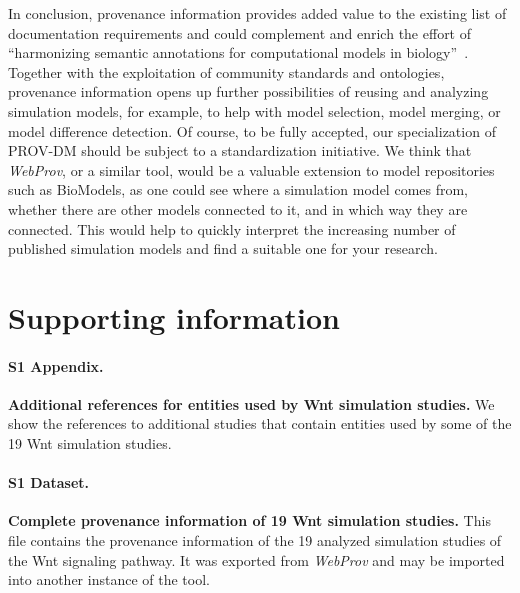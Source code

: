 \documentclass[10pt,letterpaper]{article}
\newcommand{\webprov}{\textit{WebProv}}
\newcommand{\wnt}{Wnt}
\begin{document}
In conclusion, provenance information provides added value to the existing list of documentation requirements and could complement and enrich the effort of \enquote{harmonizing semantic annotations for computational models in biology}~\cite{Neal2019}.
Together with the exploitation of community standards and ontologies, provenance information opens up further possibilities of reusing and analyzing simulation models, for example, to help with model selection, model merging, or model difference detection.
Of course, to be fully accepted, our specialization of PROV-DM should be subject to a standardization initiative.
We think that \webprov{}, or a similar tool, would be a valuable extension to model repositories such as BioModels, as one could see where a simulation model comes from, whether there are other models connected to it, and in which way they are connected.
This would help to quickly interpret the increasing number of published simulation models and find a suitable one for your research.




\section*{Supporting information}


\paragraph*{S1 Appendix.}\label{S1_AdditionalReferencesWntStudies}
{\bf Additional references for entities used by \wnt{} simulation studies.} We show the references to additional studies that contain entities used by some of the 19 \wnt{} simulation studies.

\paragraph*{S1 Dataset.}\label{S1_Provenanceinforamtion}
{\bf Complete provenance information of 19 \wnt{} simulation studies.} This file contains the provenance information of the 19 analyzed simulation studies of the \wnt{} signaling pathway. It was exported from \webprov{} and may be imported into another instance of the tool.
\end{document}
